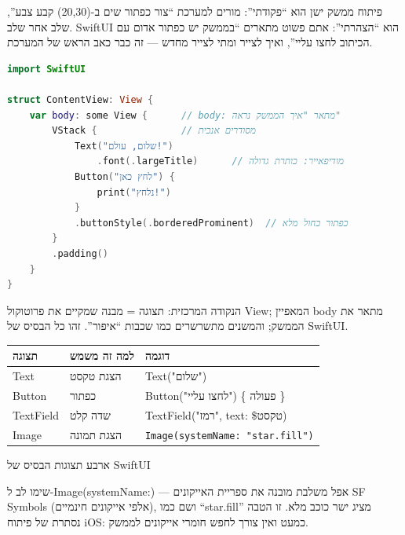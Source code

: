 


פיתוח ממשק ישן הוא “פקודתי”: מורים למערכת “צור כפתור שים ב-(20,30) קבע צבע”, שלב אחר שלב. SwiftUI הוא “הצהרתי”: אתם פשוט מתארים “בממשק יש כפתור אדום עם הכיתוב לחצו עליי”, ואיך לצייר ומתי לצייר מחדש — זה כבר כאב הראש של המערכת.

\begin{lstlisting}[language=Swift]
import SwiftUI

struct ContentView: View {
    var body: some View {      // body: מתאר "איך הממשק נראה"
        VStack {               // מסודרים אנכית
            Text("שלום, עולם!")
                .font(.largeTitle)      // מודיפאייר: כותרת גדולה
            Button("לחץ כאן") {
                print("נלחץ!")
            }
            .buttonStyle(.borderedProminent)  // כפתור כחול מלא
        }
        .padding()
    }
}
\end{lstlisting}

הנקודה המרכזית: תצוגה = מבנה שמקיים את פרוטוקול View; המאפיין body מתאר את הממשק; והמשנים מתשרשרים כמו שכבות “איפור”. זהו כל הבסיס של SwiftUI.


\begin{center}
\begin{tabularx}{\linewidth}{|X|X|X|}
\hline
\textbf{תצוגה} & \textbf{למה זה משמש} & \textbf{דוגמה} \tabularnewline
\hline
Text & הצגת טקסט & Text("שלום") \tabularnewline
Button & כפתור & Button("לחצו עליי") \{ פעולה \} \tabularnewline
TextField & שדה קלט & TextField("רמז", text: \$טקסט) \tabularnewline
Image & הצגת תמונה & \texttt{Image(systemName: "star.\allowbreak fill")} \tabularnewline
\hline
\end{tabularx}
\end{center}

\begin{center}\small\color{gray}ארבע תצוגות הבסיס של SwiftUI\end{center}

שימו לב ל-Image(systemName:) — אפל משלבת מובנה את ספריית האייקונים SF Symbols (אלפי אייקונים חינמיים), ושם כמו “star.fill” מציג ישר כוכב מלא. זו הטבה נסתרת של פיתוח iOS: כמעט ואין צורך לחפש חומרי אייקונים לממשק.

